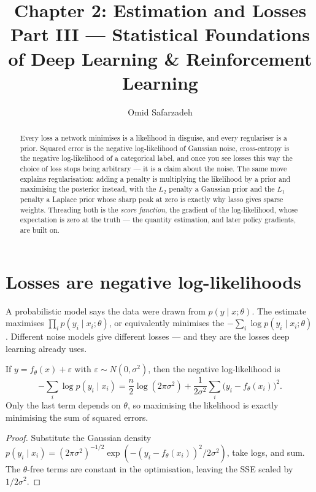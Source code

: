 \documentclass[11pt]{article}
\title{Chapter 2: Estimation and Losses \\ \large Part III --- Statistical Foundations of Deep Learning \& Reinforcement Learning}
\author{Omid Safarzadeh}
\date{}
\begin{document}
\maketitle

\begin{abstract}
\noindent
Every loss a network minimises is a likelihood in disguise, and every
regulariser is a prior. Squared error is the negative log-likelihood of Gaussian
noise, cross-entropy is the negative log-likelihood of a categorical label, and
once you see losses this way the choice of loss stops being arbitrary --- it is a
claim about the noise. The same move explains regularisation: adding a penalty is
multiplying the likelihood by a prior and maximising the posterior instead, with
the $L_2$ penalty a Gaussian prior and the $L_1$ penalty a Laplace prior whose
sharp peak at zero is exactly why lasso gives sparse weights. Threading both is
the \emph{score function}, the gradient of the log-likelihood, whose expectation
is zero at the truth --- the quantity estimation, and later policy gradients,
are built on.
\end{abstract}

\tableofcontents

\section{Losses are negative log-likelihoods}

A probabilistic model says the data were drawn from $p(y\mid x;\theta)$. The
 estimate maximises $\prod_i p(y_i\mid x_i;\theta)$,
or equivalently minimises the 
$-\sum_i \log p(y_i\mid x_i;\theta)$. Different noise models give different
losses --- and they are the losses deep learning already uses.

\begin{theorem}
If $y = f_\theta(x) + \varepsilon$ with $\varepsilon\sim N(0,\sigma^2)$, then the
negative log-likelihood is
\[
  -\sum_i \log p(y_i\mid x_i)
   = \frac{n}{2}\log(2\pi\sigma^2) + \frac{1}{2\sigma^2}\sum_i\big(y_i-f_\theta(x_i)\big)^2.
\]
Only the last term depends on $\theta$, so maximising the likelihood is exactly
minimising the sum of squared errors.
\end{theorem}
\begin{proof}
Substitute the Gaussian density $p(y_i\mid x_i)=
(2\pi\sigma^2)^{-1/2}\exp(-(y_i-f_\theta(x_i))^2/2\sigma^2)$, take logs, and sum.
The $\theta$-free terms are constant in the optimisation, leaving the SSE scaled
by $1/2\sigma^2$.
\end{proof}
\end{document}
